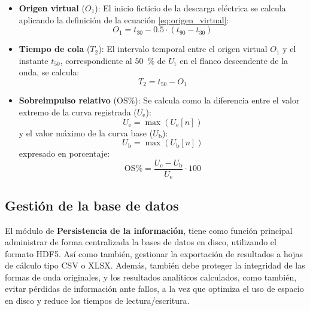 \begin{enumerate}[resume]
\begin{itemize}
        \begin{equation}
            T_1 = \frac{t_{90} - t_{30}}{\num{0.6}}
            \label{eq:tiempo_frente_2}
        \end{equation}
        \item \textbf{Origen virtual} ($O_1$): El inicio ficticio de la descarga eléctrica se calcula aplicando la definición de la ecuación \ref{eq:origen_virtual}:
        \begin{equation}
            O_1 = t_{30} - 0.5 \cdot (t_{90} - t_{30})
            \label{eq:origen_virtual_2}
        \end{equation}
        \item \textbf{Tiempo de cola} ($T_2$): El intervalo temporal entre el origen virtual $O_1$ y el instante $t_{50}$, correspondiente al \qty{50}{\percent} de $U_\text{t}$ en el flanco descendente de la onda, se calcula:
        \begin{equation}
            T_2 = t_{50} - O_1
            \label{eq:tiempo_cola}
        \end{equation}
        \item \textbf{Sobreimpulso relativo} ($\text{OS}\%$): Se calcula como la diferencia entre el valor extremo de la curva registrada ($U_\text{e}$):
        \begin{equation}
            U_\text{e} = \max(U_\text{e}[n])
            \label{eq:max_curva_registrada}
        \end{equation}
        y el valor máximo de la curva base ($U_\text{b}$):
        \begin{equation}
            U_\text{b} = \max(U_\text{b}[n])
            \label{eq:max_curva_base}
        \end{equation}
        expresado en porcentaje:
        \begin{equation}
            \text{OS}\% = \frac{U_\text{e} - U_\text{b}}{U_\text{e}} \cdot \num{100}
            \label{eq:sobreimpulso_relativo}
        \end{equation}
    \end{itemize}
\end{enumerate}

\subsection{Gestión de la base de datos}
\label{subsec:gestion_base_datos}

El módulo de \textbf{Persistencia de la información}, tiene como función principal administrar de forma centralizada la bases de datos en disco, utilizando el formato HDF5. Así como también, gestionar la exportación de resultados a hojas de cálculo tipo CSV o XLSX. Además, también debe proteger la integridad de las formas de onda originales, y los resultados analíticos calculados, como también, evitar pérdidas de información ante fallos, a la vez que optimiza el uso de espacio en disco y reduce los tiempos de lectura/escritura.

